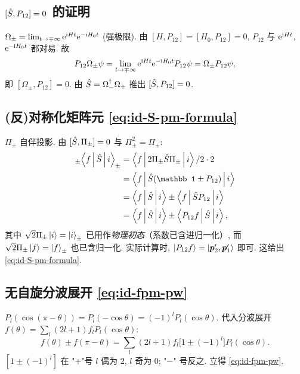 \subsection{$[\hat{S},P_{12}]=0$ 的证明}\label{sec:id-proof-S-comm}

\begin{proof*}[证明]
$\Omega_\pm=\lim_{t\to\mp\infty}\mathrm{e}^{\mathrm{i} Ht}\mathrm{e}^{-\mathrm{i} H_0 t}$ (强极限). 由
$[H,P_{12}]=[H_0,P_{12}]=0$, $P_{12}$ 与 $\mathrm{e}^{\mathrm{i} Ht}$, $\mathrm{e}^{-\mathrm{i} H_0 t}$ 都对易. 故
\begin{equation}
  P_{12}\Omega_\pm\psi=\lim_{t\to\mp\infty}\mathrm{e}^{\mathrm{i} Ht}\mathrm{e}^{-\mathrm{i} H_0 t}P_{12}\psi=\Omega_\pm P_{12}\psi,
\end{equation}
即 $[\Omega_\pm,P_{12}]=0$. 由 $\hat{S}=\Omega_-^\dagger\Omega_+$ 推出 $[\hat{S},P_{12}]=0$.\hfill
\end{proof*}

\subsection{(反)对称化矩阵元 \eqref{eq:id-S-pm-formula}}\label{sec:id-proof-pmS}

\begin{proof*}[证明]
$\Pi_\pm$ 自伴投影. 由 $[\hat{S},\Pi_\pm]=0$ 与 $\Pi_\pm^2=\Pi_\pm$:
\begin{align}
  _\pm\!\matel{f}{\Smat}{i}_\pm
  &=\matel{f}{2\Pi_\pm\Smat\Pi_\pm}{i}/2 \cdot 2 \nonumber\\
  &= \matel{f}{\Smat(\mathbb 1\pm P_{12})}{i}\nonumber\\
  &= \matel{f}{\Smat}{i}\pm \matel{f}{\Smat P_{12}}{i}\nonumber\\
  &= \matel{f}{\Smat}{i}\pm \matel{P_{12} f}{\Smat}{i},
\end{align}
其中 $\sqrt 2\Pi_\pm\ket{i}=\ket{i}_\pm$ 已用作\emph{物理初态}（系数已含进归一化）, 而 $\sqrt 2\Pi_\pm\ket{f}=\ket{f}_\pm$ 也已含归一化. 实际计算时, $\ket{P_{12} f}=\ket{\bm p_2',\bm p_1'}$ 即可. 这给出 \eqref{eq:id-S-pm-formula}.\hfill
\end{proof*}

\subsection{无自旋分波展开 \eqref{eq:id-fpm-pw}}\label{sec:id-proof-pw}

\begin{proof*}[证明]
$P_l(\cos(\pi-\theta))=P_l(-\cos\theta)=(-1)^l P_l(\cos\theta)$. 代入分波展开
$f(\theta)=\sum_l(2l+1)f_l P_l(\cos\theta)$:
\begin{equation}
  f(\theta)\pm f(\pi-\theta)=\sum_l(2l+1)f_l\bigl[1\pm(-1)^l\bigr]P_l(\cos\theta).
\end{equation}
$[1\pm(-1)^l]$ 在 "+"号 $l$ 偶为 $2$, $l$ 奇为 $0$; "−" 号反之. 立得 \eqref{eq:id-fpm-pw}.\hfill
\end{proof*}

